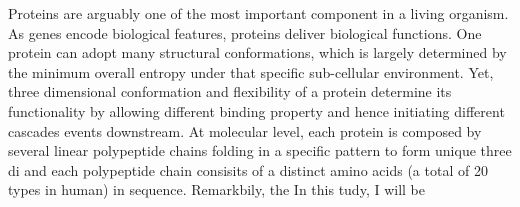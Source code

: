 Proteins are arguably one of the most important component in a living organism. As genes encode biological features, proteins deliver biological functions. One protein can adopt many structural conformations, which is largely determined by the minimum overall entropy under that specific sub-cellular environment. Yet, three dimensional conformation and flexibility of a protein determine its functionality by allowing different binding property and hence initiating different cascades events downstream. At molecular level, each protein is composed by several linear polypeptide chains folding in a specific pattern to form unique three di and each polypeptide chain consisits of a distinct amino acids (a total of 20 types in human) in sequence. Remarkbily, the  In this tudy, I will be 